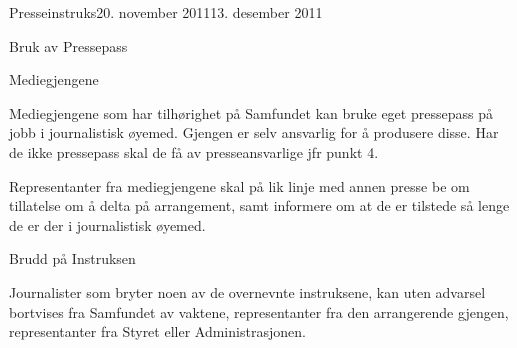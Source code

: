 \documentclass[../fsbok.tex]{subfiles}
\begin{document}
\begin{instruks}{Presseinstruks}{20. november 2011}{13. desember 2011}
\begin{instruksledd}{Bruk av Pressepass}
    \end{instruksledd}


    \begin{instruksledd}{Mediegjengene}

Mediegjengene som har tilhørighet på Samfundet kan bruke eget pressepass på jobb i journalistisk øyemed. Gjengen er selv ansvarlig for å produsere disse. Har de ikke pressepass skal de få av presseansvarlige jfr punkt 4.


Representanter fra mediegjengene skal på lik linje med annen presse be om tillatelse om å delta på arrangement, samt informere om at de er tilstede så lenge de er der i journalistisk øyemed.

    \end{instruksledd}

  \begin{instruksledd}{Brudd på Instruksen}

Journalister som bryter noen av de overnevnte instruksene, kan uten advarsel bortvises fra Samfundet av vaktene, representanter fra den arrangerende gjengen, representanter fra Styret eller Administrasjonen.

\end{instruksledd}

\end{instruks}
\end{document}
